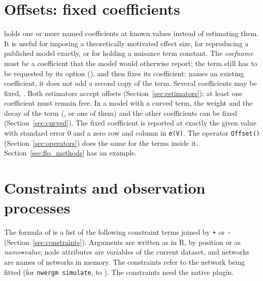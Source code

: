 \section{Offsets: fixed coefficients}\label{sec:offset}

 holds one or more named coefficients at known values instead of estimating them. It is useful for imposing a theoretically motivated effect size, for reproducing a published model exactly, or for holding a nuisance term constant. The \emph{coefname} must be a coefficient that the model would otherwise report; the term still has to be requested by its option (), and  then fixes its coefficient:  names an existing coefficient, it does not add a second copy of the term. Several coefficients may be fixed, . Both estimators accept offsets (Section~\ref{sec:estimators}); at least one coefficient must remain free. In a model with a curved term, the weight and the decay of the term (, or one of them) and the other coefficients can be fixed (Section~\ref{sec:curved}). The fixed coefficient is reported at exactly the given value with standard error 0 and a zero row and column in \texttt{e(V)}. The operator \texttt{Offset()} (Section~\ref{sec:operators}) does the same for the terms inside it. Section~\ref{sec:flo_methods} has an example.

\section{Constraints and observation processes}\label{sec:conslist}

The formula of  is a list of the following constraint terms joined by \texttt{+} or \texttt{-} (Section~\ref{sec:constraints}). Arguments are written as in R, by position or as \emph{name}\texttt{=}\emph{value}; node attributes are variables of the current dataset, and networks are names of networks in memory. The constraints refer to the network being fitted (for \texttt{nwergm simulate}, to ). The constraints need the native plugin.

